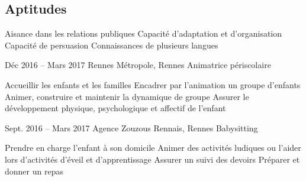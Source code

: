 \documentclass[30pt, french]{tccv}
\begin{document}
\begin{upshape}
\begin{competence}
\vspace{0.5cm}
\section{Aptitudes}
\begin{itemize}[leftmargin=13pt]
  \setlength\itemsep{-3pt} 
  \cvitem[\checkmark]  Aisance dans les relations publiques
  \cvitem[\checkmark]  Capacité d'adaptation et d'organisation
  \cvitem[\checkmark]  Capacité de persuasion
  \cvitem[\checkmark]  Connaissances de plusieurs langues
\end{itemize}



\end{competence}




%
%


\begin{experience}


    
    
    
\item{Déc 2016 -- Mars 2017}
     {Rennes Métropole, Rennes}
     {Animatrice périscolaire}
     \fontsize{9pt}{1em}\color{text}\bodyfontlight\upshape\selectfont
    
    \begin{itemize}
      \cvitem[\checkmark] Accueillir les enfants et les familles                      
      \cvitem[\checkmark] Encadrer par l’animation un groupe d’enfants
      \cvitem[\checkmark] Animer, construire et maintenir la dynamique de groupe               
      \cvitem[\checkmark] Assurer le développement physique, psychologique et affectif de l’enfant                                            
    \end{itemize}     




\setlength{\parskip}{0pt}    
\item{Sept. 2016 -- Mars 2017 }     
  {Agence Zouzous Rennais, Rennes}     
  {Babysitting}
     \fontsize{9pt}{1em}\color{text}\bodyfontlight\upshape\selectfont

\begin{itemize}
      \cvitem[\checkmark]  Prendre en charge l’enfant à son domicile                                    
      \cvitem[\checkmark]  Animer des activités ludiques ou l’aider lors d’activités d’éveil et d’apprentissage                                            
      \cvitem[\checkmark]  Assurer un suivi des devoirs
      \cvitem[\checkmark]  Préparer et donner un repas


\end{itemize}
\end{experience}
\end{upshape}
\end{document}
